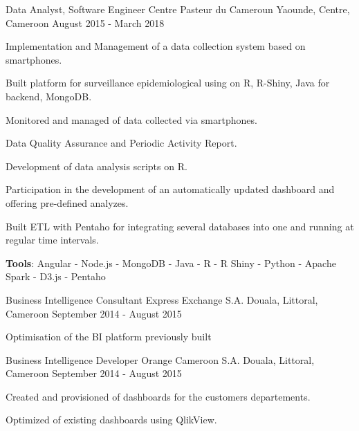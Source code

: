 \begin{cventries}
  \cventry
    {Data Analyst, Software Engineer} %
    {Centre Pasteur du Cameroun} %
    {Yaounde, Centre, Cameroon} %
    {August 2015 - March 2018} %
    {
      \begin{cvitems} %
        \item {Implementation and Management of a data collection system based on smartphones.}
        \item {Built platform for surveillance epidemiological using on R, R-Shiny, Java for backend, MongoDB.}
        \item {Monitored and managed of data collected via smartphones.}
        \item {Data Quality Assurance and Periodic Activity Report.}
        \item {Development of data analysis scripts on R.}
        \item {Participation in the development of an automatically updated dashboard and offering pre-defined analyzes.}
        \item {Built ETL with Pentaho for integrating several databases into one and running at regular time intervals.}
        \item {\textbf{Tools}: Angular - Node.js - MongoDB - Java - R - R Shiny - Python - Apache Spark - D3.js - Pentaho}
      \end{cvitems}
    }

  \cventry
    {Business Intelligence Consultant} %
    {Express Exchange S.A.} %
    {Douala, Littoral, Cameroon} %
    {September 2014 - August 2015} %
    {
      \begin{cvitems} %
        \item {Optimisation of the BI platform previously built}
      \end{cvitems}
    }

  \cventry
    {Business Intelligence Developer} %
    {Orange Cameroon S.A.} %
    {Douala, Littoral, Cameroon} %
    {September 2014 - August 2015} %
    {
      \begin{cvitems} %
        \item {Created and provisioned of dashboards for the customers departements.}
        \item {Optimized of existing dashboards using QlikView.}
      \end{cvitems}
    }


\end{cventries}
